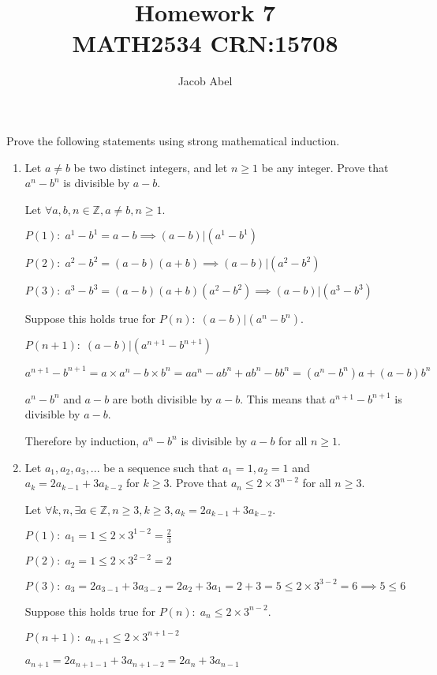 \documentclass[12pt,letterpaper,titlepage]{article}
\author{Jacob Abel}
\title{	Homework 7
	\\\large MATH2534 CRN:15708
}
\begin{document}
\maketitle
\begin{raggedright}
Prove the following statements using strong mathematical induction.

\begin{enumerate}

\item Let $a \neq b$ be two distinct integers, and let $n \geq 1$ be any integer. Prove that $a^n - b^n$ is divisible by $a - b$.

Let $\forall a, b, n \in \mathbb{Z}, a\neq b, n \geq 1$.

$P(1):\;a^1-b^1 = a-b \implies (a-b)|(a^1-b^1)$

$P(2):\;a^2-b^2 = (a-b)(a+b) \implies (a-b)|(a^2-b^2)$

$P(3):\;a^3-b^3 = (a-b)(a+b)(a^2-b^2) \implies (a-b)|(a^3-b^3)$

Suppose this holds true for $P(n):\;(a-b)|(a^n-b^n)$.

$P(n+1):\;(a-b)|(a^{n+1}-b^{n+1})$

$a^{n+1}-b^{n+1} = a\times a^n - b\times b^n =aa^n-ab^n+ab^n-bb^n=(a^n-b^n)a+(a-b)b^n$

$a^n-b^n$ and $a-b$ are both divisible by $a-b$. This means that $a^{n+1}-b^{n+1}$ is divisible by $a-b$.

Therefore by induction, $a^n-b^n$ is divisible by $a-b$ for all $n \geq 1$.

\item Let $a_1, a_2, a_3, ...$ be a sequence such that $a_1 = 1, a_2 = 1$ and $a_k = 2a_{k−1} + 3a_{k−2}$ for $k \geq 3$. Prove that $a_n \leq 2 \times 3^{n−2}$ for all $n \geq 3$.

Let $\forall k, n, \exists a \in \mathbb{Z}, n \geq 3, k \geq 3, a_k = 2a_{k−1} + 3a_{k−2}$.

$P(1):\; a_1 = 1 \leq 2\times 3^{1-2} = \frac{2}{3}$

$P(2):\; a_2 = 1 \leq 2\times 3^{2-2} = 2$

$P(3):\; a_3 = 2a_{3-1} + 3a_{3-2} = 2a_2 + 3a_1 = 2+3 = 5 \leq 2\times 3^{3-2} = 6 \implies 5 \leq 6$

Suppose this holds true for $P(n):\;a_n \leq 2 \times 3^{n−2}$.

$P(n+1):\;a_{n+1} \leq 2 \times 3^{n + 1 −2}$

$a_{n+1} = 2a_{n+1−1} + 3a_{n+1−2} = 2a_n + 3a_{n−1}$


\end{enumerate}
\end{raggedright}
\end{document}
